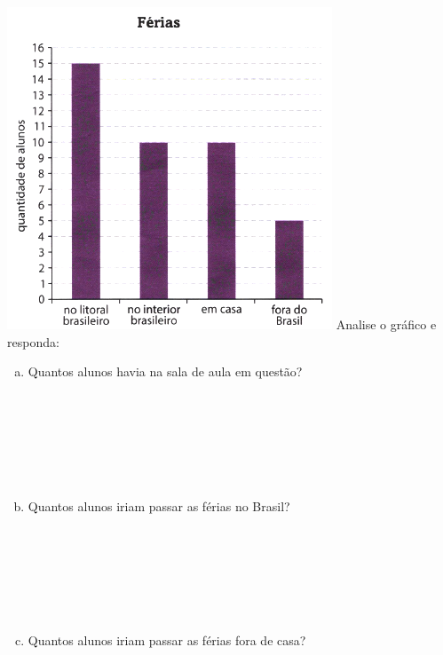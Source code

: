 \documentclass[a4paper,14pt]{article}
\begin{document}
\begin{multicols}{2}
\begin{enumerate}
			\\\\\\\\\\\\\\
			\includegraphics[width=1\linewidth]{6FMA119_imagens/imagem3}
			Analise o gráfico e responda:
			\begin{enumerate}[a)]
				\item Quantos alunos havia na sala de aula em questão? \\\\\\\\\\\\\\
				\item Quantos alunos iriam passar as férias no Brasil? \\\\\\\\\\\\\\
				\item Quantos alunos iriam passar as férias fora de casa? \\\\\\\\\\\\\\

\end{enumerate}
\end{enumerate}
\end{multicols}
\end{document}
